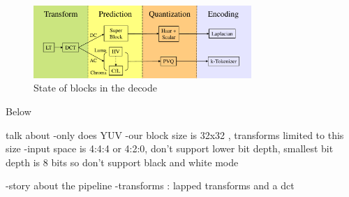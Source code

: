 \documentclass[conference, 10pt]{IEEEtran}
\begin{document}
\begin{figure}[h]
\begin{center}
\noindent
  \includegraphics[natwidth=9in,natheight=3in,width=3.25in]{daala_pipeline.pdf}
  \caption[example]{\label{fig:pipeline} State of blocks in the decode}
\end{center}
\end{figure}

Below

%
%
%


%

 talk about
 -only does YUV
 -our block size is 32x32 , transforms limited to this size
 -input space is 4:4:4 or 4:2:0, don't support lower bit depth, smallest bit depth is 8 bits so don't support black and white mode
 
 -story about the pipeline
 -transforms : lapped transforms and a dct
 
\end{document}
